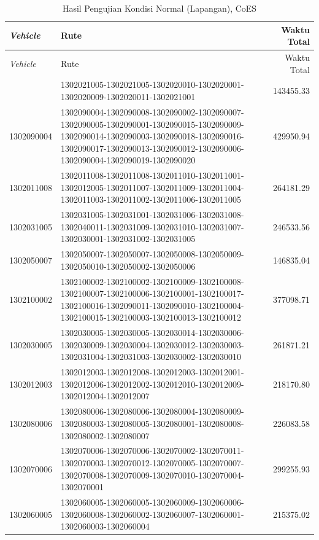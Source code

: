 \begin{longtable}[!]{lp{8cm}r}
	\caption{Hasil Pengujian Kondisi Normal (Lapangan), CoES}
	\label{tbl:test_result_normal_field_coes}\\
	\toprule
		\textit{Vehicle} & Rute & Waktu Total\\ 
	\midrule
	\endfirsthead
	\toprule
		\textit{Vehicle} & Rute & Waktu Total\\ 
	\midrule
	\endhead
	\bottomrule
	\endfoot
		1302021005 & 1302021005-1302021005-1302020010-1302020001-1302020009-1302020011-1302021001 & 143455.33 \\
		1302090004 & 1302090004-1302090008-1302090002-1302090007-1302090005-1302090001-1302090015-1302090009-1302090014-1302090003-1302090018-1302090016-1302090017-1302090013-1302090012-1302090006-1302090004-1302090019-1302090020 & 429950.94 \\
		1302011008 & 1302011008-1302011008-1302011010-1302011001-1302012005-1302011007-1302011009-1302011004-1302011003-1302011002-1302011006-1302011005 & 264181.29 \\
		1302031005 & 1302031005-1302031001-1302031006-1302031008-1302040011-1302031009-1302031010-1302031007-1302030001-1302031002-1302031005 & 246533.56 \\
		1302050007 & 1302050007-1302050007-1302050008-1302050009-1302050010-1302050002-1302050006 & 146835.04 \\
		1302100002 & 1302100002-1302100002-1302100009-1302100008-1302100007-1302100006-1302100001-1302100017-1302100016-1302090011-1302090010-1302100004-1302100015-1302100003-1302100013-1302100012 & 377098.71 \\
		1302030005 & 1302030005-1302030005-1302030014-1302030006-1302030009-1302030004-1302030012-1302030003-1302031004-1302031003-1302030002-1302030010 & 261871.21 \\
		1302012003 & 1302012003-1302012008-1302012003-1302012001-1302012006-1302012002-1302012010-1302012009-1302012004-1302012007 & 218170.80 \\
		1302080006 & 1302080006-1302080006-1302080004-1302080009-1302080003-1302080005-1302080001-1302080008-1302080002-1302080007 & 226083.58 \\
		1302070006 & 1302070006-1302070006-1302070002-1302070011-1302070003-1302070012-1302070005-1302070007-1302070008-1302070009-1302070010-1302070004-1302070001 & 299255.93 \\
		1302060005 & 1302060005-1302060005-1302060009-1302060006-1302060008-1302060002-1302060007-1302060001-1302060003-1302060004 & 215375.02 \\

\end{longtable}
